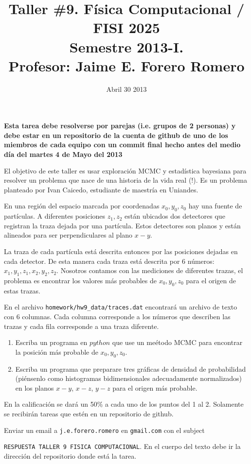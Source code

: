 \documentclass{article}
\title{Taller \#9. F\'isica Computacional / FISI 2025 \\Semestre
  2013-I. \\ Profesor: Jaime E. Forero Romero}
\date{Abril 30 2013}
\begin{document}
\maketitle

{\bf Esta tarea debe resolverse por parejas (i.e. grupos de 2
  personas) y debe estar en un repositorio de la cuenta de github de
  uno de los miembros de cada equipo con un commit final hecho antes del
  medio d\'ia del martes 4 de Mayo del 2013}  

El objetivo de este taller es usar exploraci\'on MCMC y estad\'istica
bayesiana para resolver un problema que nace de una historia de la vida real
(!). Es un problema planteado por Ivan Caicedo, estudiante de
maestr\'ia en Uniandes. 

En una regi\'on del espacio marcada por coordenadas $x_{0}, y_{0},
z_{0}$ hay una fuente de part\'iculas. A diferentes
posiciones $z_1,z_2$ est\'an ubicados dos detectores que
registran la traza dejada por una part\'icula. Estos detectores son
planos y est\'an alineados para ser perpendiculares al plano $x-y$.  

La traza de cada part\'icula est\'a descrita entonces por las
posiciones dejadas en cada detector. De esta manera cada traza est\'a
descrita por 6 n\'umeros: $x_1,y_1, z_1, x_2,y_2, z_2$. Nosotros
contamos con las mediciones de diferentes trazas, el problema es
encontrar los valores m\'as probables de $x_0,y_0,z_0$ para el origen de estas trazas.


En el archivo \verb"homework/hw9_data/traces.dat" encontrar\'a un archivo de texto con 6
columnas. Cada columna corresponde a los n\'umeros que describen las
trazas y cada fila corresponde a una traza diferente.
\begin{enumerate}
\item 
Escriba un programa en $python$ que use un me\'etodo MCMC para
encontrar la posici\'on m\'as probable de $x_0,y_0,z_0$. 

\item 
Escriba un programa que preparare tres gr\'aficas de densidad de
probabilidad (pi\'ensenlo como histogramas bidimensionales
adecuadamente normalizados) en los planos $x-y$, $x-z$, $y-z$ para el
origen m\'as probable.   
\end{enumerate}

En la calificaci\'on se dar\'a un 50\% a cada uno de los puntos del 1
al 2. Solamente se recibir\'an tareas que est\'en en un repositorio de
github. 

Enviar un email a {\tt  j.e.forero.romero} en {\tt gmail.com} con el
subject


\verb"RESPUESTA TALLER 9 FISICA COMPUTACIONAL". En el cuerpo del texto
debe ir la direcci\'on del repositorio donde est\'a la tarea.  
\end{document}
